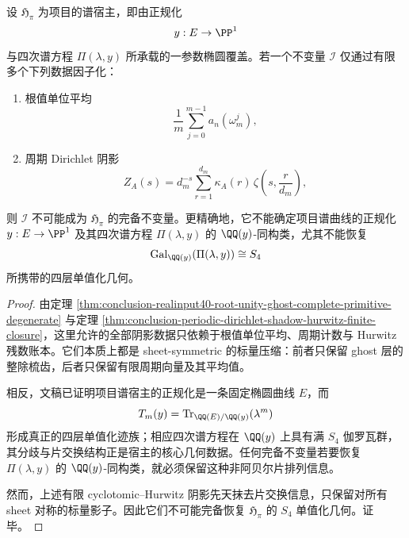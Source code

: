 \begin{theorem}\label{thm:conclusion-finite-cyclotomic-hurwitz-shadows-incomplete-for-s4-elliptic-host}
设 \(\mathfrak H_{\pi}\) 为项目的谱宿主，即由正规化
\[
y:E\to \PP^1
\]
与四次谱方程 \(\Pi(\lambda,y)\) 所承载的一参数椭圆覆盖。若一个不变量 \(\mathcal I\) 仅通过有限多个下列数据因子化：
\begin{enumerate}
  \item 根值单位平均
  \[
  \frac1m\sum_{j=0}^{m-1}a_n(\omega_m^j),
  \]
  \item 周期 Dirichlet 阴影
  \[
  Z_A(s)=d_m^{-s}\sum_{r=1}^{d_m}\kappa_A(r)\,\zeta\!\left(s,\frac{r}{d_m}\right),
  \]
\end{enumerate}
则 \(\mathcal I\) 不可能成为 \(\mathfrak H_{\pi}\) 的完备不变量。更精确地，它不能确定项目谱曲线的正规化 \(y:E\to \PP^1\) 及其四次谱方程 \(\Pi(\lambda,y)\) 的 \(\QQ(y)\)-同构类，尤其不能恢复
\[
\operatorname{Gal}_{\QQ(y)}(\Pi(\lambda,y))\cong S_4
\]
所携带的四层单值化几何。
\end{theorem}
\begin{proof}
由定理 \ref{thm:conclusion-realinput40-root-unity-ghost-complete-primitive-degenerate} 与定理 \ref{thm:conclusion-periodic-dirichlet-shadow-hurwitz-finite-closure}，这里允许的全部阴影数据只依赖于根值单位平均、周期计数与 Hurwitz 残数账本。它们本质上都是 sheet-symmetric 的标量压缩：前者只保留 ghost 层的整除梳齿，后者只保留有限周期向量及其平均值。

相反，文稿已证明项目谱宿主的正规化是一条固定椭圆曲线 \(E\)，而
\[
T_m(y)=\operatorname{Tr}_{\QQ(E)/\QQ(y)}(\lambda^m)
\]
形成真正的四层单值化迹族；相应四次谱方程在 \(\QQ(y)\) 上具有满 \(S_4\) 伽罗瓦群，其分歧与片交换结构正是宿主的核心几何数据。任何完备不变量若要恢复 \(\Pi(\lambda,y)\) 的 \(\QQ(y)\)-同构类，就必须保留这种非阿贝尔片排列信息。

然而，上述有限 cyclotomic--Hurwitz 阴影先天抹去片交换信息，只保留对所有 sheet 对称的标量影子。因此它们不可能完备恢复 \(\mathfrak H_{\pi}\) 的 \(S_4\) 单值化几何。证毕。
\end{proof}

